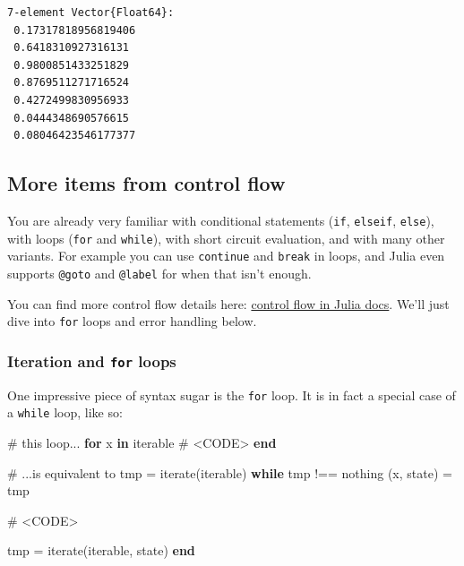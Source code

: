 \documentclass[
]{article}
\newenvironment{Shaded}{\begin{snugshade}}{\end{snugshade}}
\newcommand{\CommentTok}[1]{\textcolor[rgb]{0.37,0.37,0.37}{#1}}
\newcommand{\ConstantTok}[1]{\textcolor[rgb]{0.56,0.35,0.01}{#1}}
\newcommand{\ControlFlowTok}[1]{\textcolor[rgb]{0.00,0.23,0.31}{\textbf{#1}}}
\newcommand{\FunctionTok}[1]{\textcolor[rgb]{0.28,0.35,0.67}{#1}}
\newcommand{\KeywordTok}[1]{\textcolor[rgb]{0.00,0.23,0.31}{\textbf{#1}}}
\newcommand{\NormalTok}[1]{\textcolor[rgb]{0.00,0.23,0.31}{#1}}
\newcommand{\OperatorTok}[1]{\textcolor[rgb]{0.37,0.37,0.37}{#1}}
\begin{document}
\begin{verbatim}
7-element Vector{Float64}:
 0.17317818956819406
 0.6418310927316131
 0.9800851433251829
 0.8769511271716524
 0.4272499830956933
 0.0444348690576615
 0.08046423546177377
\end{verbatim}

\subsection{More items from control
flow}\label{more-items-from-control-flow}

You are already very familiar with conditional statements (\texttt{if},
\texttt{elseif}, \texttt{else}), with loops (\texttt{for} and
\texttt{while}), with short circuit evaluation, and with many other
variants. For example you can use \texttt{continue} and \texttt{break}
in loops, and Julia even supports \texttt{@goto} and \texttt{@label} for
when that isn't enough.

You can find more control flow details here:
\href{https://docs.julialang.org/en/v1/manual/control-flow/}{control
flow in Julia docs}. We'll just dive into \texttt{for} loops and error
handling below.

\subsubsection{\texorpdfstring{Iteration and \texttt{for}
loops}{Iteration and for loops}}\label{iteration-and-for-loops}

One impressive piece of syntax sugar is the \texttt{for} loop. It is in
fact a special case of a \texttt{while} loop, like so:

\begin{Shaded}
\begin{Highlighting}[]
\CommentTok{\# this loop...}
\ControlFlowTok{for}\NormalTok{ x }\KeywordTok{in}\NormalTok{ iterable}
   \CommentTok{\# \textless{}CODE\textgreater{}}
\ControlFlowTok{end}

\CommentTok{\# ...is equivalent to}
\NormalTok{tmp }\OperatorTok{=} \FunctionTok{iterate}\NormalTok{(iterable)}
\ControlFlowTok{while}\NormalTok{ tmp }\OperatorTok{!==} \ConstantTok{nothing}
\NormalTok{   (x, state) }\OperatorTok{=}\NormalTok{ tmp}

   \CommentTok{\# \textless{}CODE\textgreater{}}
   
\NormalTok{   tmp }\OperatorTok{=} \FunctionTok{iterate}\NormalTok{(iterable, state)}
\ControlFlowTok{end}
\end{Highlighting}
\end{Shaded}
\end{document}
